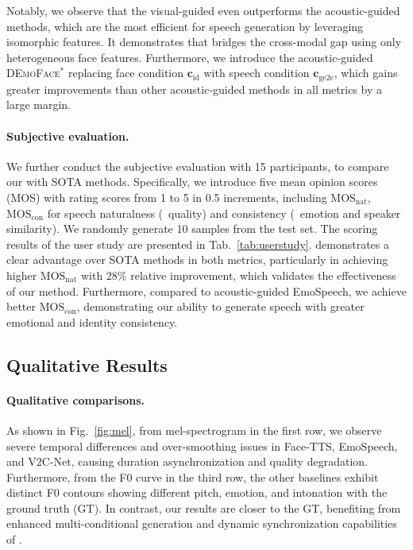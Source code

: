 Notably, we observe that the visual-guided \methodname even outperforms the acoustic-guided methods, which are the most efficient for speech generation by leveraging isomorphic features. It demonstrates that \methodname bridges the cross-modal gap using only heterogeneous face features. 
Furthermore, we introduce the acoustic-guided \textsc{DEmoFace}$^*$ replacing face condition $\bm{c}_\text{id}$ with speech condition $\bm{c}_\text{ge2e}$, which gains greater improvements than other acoustic-guided methods in all metrics by a large margin. 


\paragraph{Subjective evaluation.~~\xspace}
We further conduct the subjective evaluation with 15 participants, to compare our \methodname with SOTA methods.
Specifically, we introduce five mean opinion scores (MOS) with rating scores from 1 to 5 in 0.5 increments, including $\text{MOS}_\text{nat}$, $\text{MOS}_\text{con}$ for speech naturalness (\ie~quality) and consistency (\ie~emotion and speaker similarity). We randomly generate 10 samples from the test set. 
The scoring results of the user study are presented in Tab.~\ref{tab:userstudy}. \methodname demonstrates a clear advantage over SOTA methods in both metrics, particularly in achieving higher $\text{MOS}_\text{nat}$ with 28\% relative improvement, which validates the effectiveness of our method. Furthermore, compared to acoustic-guided EmoSpeech, we achieve better $\text{MOS}_\text{con}$, demonstrating our ability to generate speech with greater emotional and identity consistency.



\subsection{Qualitative Results}
\paragraph{Qualitative comparisons.~~\xspace} 
As shown in Fig.~\ref{fig:mel}, from mel-spectrogram in the first row, we observe severe temporal differences and over-smoothing issues in Face-TTS, EmoSpeech, and V2C-Net, causing duration asynchronization and quality degradation. 
Furthermore, from the F0 curve in the third row, the other baselines exhibit distinct F0 contours showing different pitch, emotion, and intonation with the ground truth (GT).
In contrast, our results are closer to the GT, benefiting from enhanced multi-conditional generation and dynamic synchronization capabilities of \methodname. 



